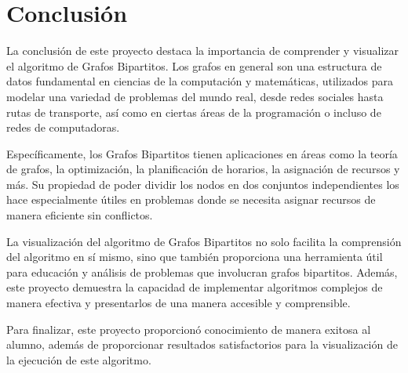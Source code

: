 \documentclass[conference]{IEEEtran}
\begin{document}
\section{Conclusión}
La conclusión de este proyecto destaca la importancia de comprender y visualizar el algoritmo de Grafos Bipartitos. Los grafos en general son una estructura de datos fundamental en ciencias de la computación y matemáticas, utilizados para modelar una variedad de problemas del mundo real, desde redes sociales hasta rutas de transporte, así como en ciertas áreas de la programación o incluso de redes de computadoras.

Específicamente, los Grafos Bipartitos tienen aplicaciones en áreas como la teoría de grafos, la optimización, la planificación de horarios, la asignación de recursos y más. Su propiedad de poder dividir los nodos en dos conjuntos independientes los hace especialmente útiles en problemas donde se necesita asignar recursos de manera eficiente sin conflictos.

La visualización del algoritmo de Grafos Bipartitos no solo facilita la comprensión del algoritmo en sí mismo, sino que también proporciona una herramienta útil para educación y análisis de problemas que involucran grafos bipartitos. Además, este proyecto demuestra la capacidad de implementar algoritmos complejos de manera efectiva y presentarlos de una manera accesible y comprensible.

Para finalizar, este proyecto proporcionó conocimiento de manera exitosa al alumno, además de proporcionar resultados satisfactorios para la visualización de la ejecución de este algoritmo.

\printbibliography
\end{document}
